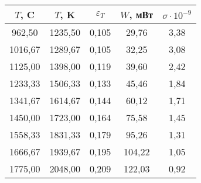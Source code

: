 \begin{table}[h!]
    \begin{tabular}{|c|c|c|c|c|}
    \hline
    $T$, C       & $T$, K    & $\varepsilon_T$   & $W$, мВт      & $\sigma \cdot 10^{-9}$ \\ \hline
    962,50       & 1235,50   & 0,105             & 29,76         & 3,38                   \\ \hline
    1016,67      & 1289,67   & 0,105             & 32,25         & 3,08                   \\ \hline
    1125,00      & 1398,00   & 0,119             & 39,60         & 2,42                   \\ \hline
    1233,33      & 1506,33   & 0,133             & 45,46         & 1,84                   \\ \hline
    1341,67      & 1614,67   & 0,144             & 60,12         & 1,71                   \\ \hline
    1450,00      & 1723,00   & 0,164             & 75,58         & 1,45                   \\ \hline
    1558,33      & 1831,33   & 0,179             & 95,26         & 1,31                   \\ \hline
    1666,67      & 1939,67   & 0,195             & 104,22        & 1,05                   \\ \hline
    1775,00      & 2048,00   & 0,209             & 122,03        & 0,92                   \\ \hline
    \end{tabular}
    \centering
    \caption{}
    \label{tabel:calculations}
\end{table}